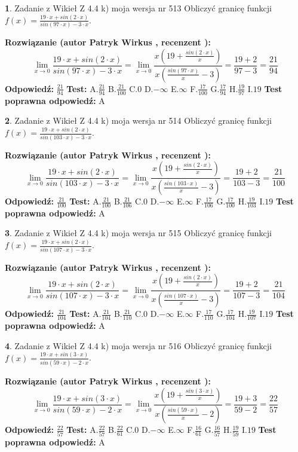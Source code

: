 \documentclass[12pt, a4paper]{article}
\theoremstyle{definition} %
\newtheorem{zad}{}
\newcommand{\zadStart}[1]{\begin{zad}#1\newline}
\newcommand{\zadStop}{\end{zad}}
\newcommand{\rozwStart}[2]{\noindent \textbf{Rozwiązanie (autor #1 , recenzent #2): }\newline}
\newcommand{\rozwStop}{\newline}
\newcommand{\odpStart}{\noindent \textbf{Odpowiedź:}\newline}
\newcommand{\odpStop}{\newline}
\newcommand{\testStart}{\noindent \textbf{Test:}\newline}
\newcommand{\testStop}{\newline}
\newcommand{\kluczStart}{\noindent \textbf{Test poprawna odpowiedź:}\newline}
\newcommand{\kluczStop}{\newline}
\begin{document}
\zadStart{Zadanie z Wikieł Z 4.4 k) moja wersja nr 513}
Obliczyć granicę funkcji $f(x)=\frac{19\cdot x +sin(2\cdot x)}{sin(97\cdot x) -3\cdot x}$.
\zadStop
\rozwStart{Patryk Wirkus}{}
$$\lim\limits_{x\to 0}\frac{19\cdot x +sin(2\cdot x)}{sin(97\cdot x) -3\cdot x}
=\lim\limits_{x\to 0}\frac{x(19+\frac{sin(2\cdot x)}{x})}{x(\frac{sin(97\cdot x)}{x}-3)}
=\frac{19+2}{97-3} = \frac{21}{94}$$
\rozwStop
\odpStart
$\frac{21}{94}$
\odpStop
\testStart
A.$\frac{21}{94}$
B.$\frac{21}{100}$
C.$0$
D.$-\infty$
E.$\infty$
F.$\frac{17}{100}$
G.$\frac{17}{94}$
H.$\frac{19}{97}$
I.$19$
\testStop
\kluczStart
A
\kluczStop



\zadStart{Zadanie z Wikieł Z 4.4 k) moja wersja nr 514}
Obliczyć granicę funkcji $f(x)=\frac{19\cdot x +sin(2\cdot x)}{sin(103\cdot x) -3\cdot x}$.
\zadStop
\rozwStart{Patryk Wirkus}{}
$$\lim\limits_{x\to 0}\frac{19\cdot x +sin(2\cdot x)}{sin(103\cdot x) -3\cdot x}
=\lim\limits_{x\to 0}\frac{x(19+\frac{sin(2\cdot x)}{x})}{x(\frac{sin(103\cdot x)}{x}-3)}
=\frac{19+2}{103-3} = \frac{21}{100}$$
\rozwStop
\odpStart
$\frac{21}{100}$
\odpStop
\testStart
A.$\frac{21}{100}$
B.$\frac{21}{106}$
C.$0$
D.$-\infty$
E.$\infty$
F.$\frac{17}{106}$
G.$\frac{17}{100}$
H.$\frac{19}{103}$
I.$19$
\testStop
\kluczStart
A
\kluczStop



\zadStart{Zadanie z Wikieł Z 4.4 k) moja wersja nr 515}
Obliczyć granicę funkcji $f(x)=\frac{19\cdot x +sin(2\cdot x)}{sin(107\cdot x) -3\cdot x}$.
\zadStop
\rozwStart{Patryk Wirkus}{}
$$\lim\limits_{x\to 0}\frac{19\cdot x +sin(2\cdot x)}{sin(107\cdot x) -3\cdot x}
=\lim\limits_{x\to 0}\frac{x(19+\frac{sin(2\cdot x)}{x})}{x(\frac{sin(107\cdot x)}{x}-3)}
=\frac{19+2}{107-3} = \frac{21}{104}$$
\rozwStop
\odpStart
$\frac{21}{104}$
\odpStop
\testStart
A.$\frac{21}{104}$
B.$\frac{21}{110}$
C.$0$
D.$-\infty$
E.$\infty$
F.$\frac{17}{110}$
G.$\frac{17}{104}$
H.$\frac{19}{107}$
I.$19$
\testStop
\kluczStart
A
\kluczStop



\zadStart{Zadanie z Wikieł Z 4.4 k) moja wersja nr 516}
Obliczyć granicę funkcji $f(x)=\frac{19\cdot x +sin(3\cdot x)}{sin(59\cdot x) -2\cdot x}$.
\zadStop
\rozwStart{Patryk Wirkus}{}
$$\lim\limits_{x\to 0}\frac{19\cdot x +sin(3\cdot x)}{sin(59\cdot x) -2\cdot x}
=\lim\limits_{x\to 0}\frac{x(19+\frac{sin(3\cdot x)}{x})}{x(\frac{sin(59\cdot x)}{x}-2)}
=\frac{19+3}{59-2} = \frac{22}{57}$$
\rozwStop
\odpStart
$\frac{22}{57}$
\odpStop
\testStart
A.$\frac{22}{57}$
B.$\frac{22}{61}$
C.$0$
D.$-\infty$
E.$\infty$
F.$\frac{16}{61}$
G.$\frac{16}{57}$
H.$\frac{19}{59}$
I.$19$
\testStop
\kluczStart
A
\kluczStop
\end{document}
